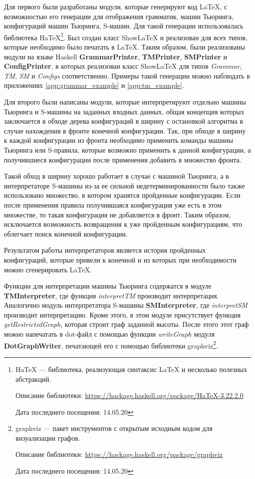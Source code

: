 \documentclass[14pt]{matmex-diploma-custom}
\begin{document}
Для первого были разработаны модули, которые генерируют код LaTeX, с возможностью его генерации для отображения грамматик, машин Тьюринга, конфигураций машин Тьюринга, S-машин. 
Для такой генерации использовалась библиотека HaTeX\footnote{HaTeX --- библиотека, реализующая синтаксис LaTeX и несколько полезных абстракций. 

Описание библиотеки: \url{https://hackage.haskell.org/package/HaTeX-3.22.2.0} 

Дата последнего посещения: 14.05.20}. 
Был создан класс ShowLaTeX и реализован для всех типов, которые необходимо было печатать в LaTeX. 
Таким образом, были реализованы модули на языке Haskell \textbf{GrammarPrinter}, \textbf{TMPrinter}, \textbf{SMPrinter} и \textbf{ConfigPrinter}, в которых реализован класс ShowLaTeX для типов \textit{Grammar}, \textit{TM}, \textit{SM} и \textit{Configs} соответственно. Примеры такой генерации можно наблюдать в приложениях \ref{app:grammar_example} и \ref{app:tm_example}.

Для второго были написаны модули, которые интерпретируют отдельно машины Тьюринга и S-машины на заданных входных данных, общая концепция которых заключается в обходе дерева конфигураций в ширину с остановкой алгоритма в случае нахождения в фронте конечной конфигурации. Так, при обходе в ширину к каждой конфигурации из фронта необходимо применить команды машины Тьюринга или S-правила, которые возможно применить к данной конфигурации, а получившиеся конфигурации после применения добавить в множество фронта. 

Такой обход в ширину хорошо работает в случае с машиной Тьюринга, а в интерпретаторе S-машины из-за ее сильной недетерминированности было также использовано множество, в котором хранятся пройденные конфигурации. Если после применения правила получившаяся конфигурация уже есть в этом множестве, то такая конфигурация не добавляется в фронт. Таким образом, исключается возможность возвращения к уже пройденным конфигурациям, что облегчает поиск конечной конфигурации.  

Результатом работы интерпретаторов является история пройденных конфигураций, которые привели к конечной и из которых при необходимости можно сгенерировать LaTeX. 

Функции для интерпретации машины Тьюринга содержатся в модуле \textbf{TMInterpreter}, где функция \textit{interpretTM} производит интерпретация. Аналогично модуль интерпретатора S-машины \textbf{SMInterpreter}, где \textit{interpretSM} производит интерпретацию. 
Кроме этого, в этом модуле присутствует функция \textit{getRestrictedGraph}, которая строит граф заданной высоты. После этого этот граф можно напечатать в dot-файл с помощью функции \textit{writeGraph} модуля \textbf{DotGraphWriter}, печатающей его с помощью библиотеки graphviz\footnote{graphviz --- пакет инструментов с открытым исходным кодом для визуализации графов. 

Описание библиотеки: \url{https://hackage.haskell.org/package/graphviz}

Дата последнего посещения: 14.05.20}. 
\end{document}
